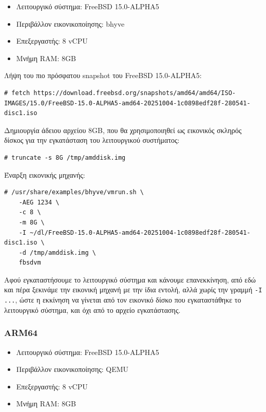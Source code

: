 \documentclass[12pt]{article}
\begin{document}
\begin{itemize}
	\item Λειτουργικό σύστημα: FreeBSD 15.0-ALPHA5
	\item Περιβάλλον εικονικοποίησης: bhyve
	\item Επεξεργαστής: 8 vCPU
	\item Μνήμη RAM: 8GB
\end{itemize}

Λήψη του πιο πρόσφατου snapshot του FreeBSD 15.0-ALPHA5:

\begin{lstlisting}
# fetch https://download.freebsd.org/snapshots/amd64/amd64/ISO-IMAGES/15.0/FreeBSD-15.0-ALPHA5-amd64-20251004-1c0898edf28f-280541-disc1.iso
\end{lstlisting}

Δημιουργία άδειου αρχείου 8GB, που θα χρησιμοποιηθεί ως εικονικός σκληρός
δίσκος για την εγκατάσταση του λειτουργικού συστήματος:

\begin{lstlisting}
# truncate -s 8G /tmp/amddisk.img
\end{lstlisting}

Έναρξη εικονικής μηχανής:

\begin{lstlisting}
# /usr/share/examples/bhyve/vmrun.sh \
	-AEG 1234 \
	-c 8 \
	-m 8G \
	-I ~/dl/FreeBSD-15.0-ALPHA5-amd64-20251004-1c0898edf28f-280541-disc1.iso \
	-d /tmp/amddisk.img \
	fbsdvm
\end{lstlisting}

Αφού εγκαταστήσουμε το λειτουργικό σύστημα και κάνουμε επανεκκίνηση, από εδώ
και πέρα ξεκινάμε την εικονική μηχανή με την ίδια εντολή, αλλά χωρίς την γραμμή
\lstinline{-I ...}, ώστε η εκκίνηση να γίνεται από τον εικονικό δίσκο που
εγκαταστάθηκε το λειτουργικό σύστημα, και όχι από το αρχείο εγκατάστασης.

\subsubsection{ARM64}

\begin{itemize}
	\item Λειτουργικό σύστημα: FreeBSD 15.0-ALPHA5
	\item Περιβάλλον εικονικοποίησης: QEMU
	\item Επεξεργαστής: 8 vCPU
	\item Μνήμη RAM: 8GB
\end{itemize}
\end{document}
